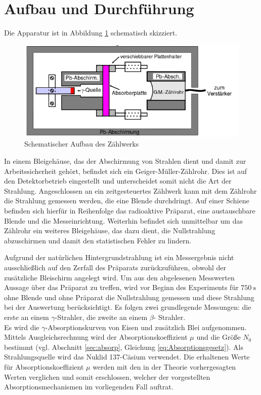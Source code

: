 \section{Aufbau und Durchf\"uhrung}
\label{sec:Durchfuehrung}
Die Apparatur ist in Abbildung \ref{fig:aufbau} schematisch skizziert.
\begin{figure}[h]
	\centering
	\includegraphics[width=\textwidth]{Bilder/aufbau.png}
	\caption{Schematischer Aufbau des Zählwerks \cite{skript}}
	\label{fig:aufbau}
\end{figure}
In einem Bleigehäuse, das der Abschirmung von Strahlen dient und damit zur Arbeitssicherheit gehört, befindet sich ein Geiger-Müller-Zählrohr.
Dies ist auf den Detektorbetrieb eingestellt und unterscheidet somit nicht die Art der Strahlung.
Angeschlossen an ein zeitgesteuertes Zählwerk kann mit dem Zählrohr die Strahlung gemessen werden, die eine Blende durchdringt.
Auf einer Schiene befinden sich hierfür in Reihenfolge das radioaktive Präparat, eine austauschbare Blende und die Messeinrichtung.
Weiterhin befindet sich unmittelbar um das Zählrohr ein weiteres Bleigehäuse, das dazu dient, die Nullstrahlung abzuschirmen und damit den statistischen Fehler zu lindern.

Aufgrund der natürlichen Hintergrundstrahlung ist ein Messergebnis nicht ausschließlich auf den Zerfall des Präparats zurückzuführen, obwohl der zusätzliche Bleischirm angelegt wird.
Um aus den abgelesenen Messwerten Aussage über das Präparat zu treffen, wird vor Beginn des Experiments für $\SI{750}{\second}$ ohne Blende und ohne Präparat die Nullstrahlung gemessen und diese Strahlung bei der Auswertung berücksichtigt.
Es folgen zwei grundlegende Messungen: die erste an einem \texorpdfstring{$\gamma$}{Gamma}-Strahler, die zweite an einem \texorpdfstring{$\beta$}{Beta}-
Strahler.\\
Es wird die \texorpdfstring{$\gamma$}{Gamma}-Absorptionskurven von Eisen und zusätzlich Blei aufgenommen.
Mittels Ausgleichsrechnung wird der Absorptionskoeffizient $\mu$ und die Größe $N_0$ bestimmt (vgl. Abschnitt \ref{sec:absorp}, Gleichung \eqref{eq:Absorptionsgesetz}). 
Als Strahlungsquelle wird das Nuklid 137-Cäsium verwendet.
Die erhaltenen Werte für Absorptionskoeffizient $\mu$ werden mit den in der Theorie vorhergesagten Werten verglichen und somit erschlossen, 
welcher der vorgestellten Absorptionsmechanismen im vorliegenden Fall auftrat.

